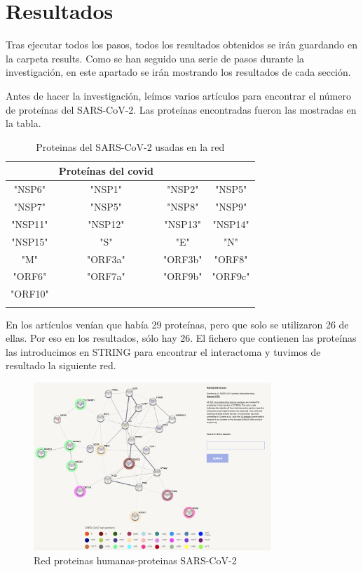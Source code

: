 
\section{Resultados}
Tras ejecutar todos los pasos, todos los resultados obtenidos se irán guardando en la carpeta results. Como se han seguido una serie de pasos durante la investigación, en este apartado se irán mostrando los resultados de cada sección. 

Antes de hacer la investigación, leímos varios artículos para encontrar el número de proteínas del SARS-CoV-2. Las proteínas encontradas fueron las mostradas en la tabla. 

  

		\begin{table}[h!]
			\caption{Proteinas del SARS-CoV-2 usadas en la red}
			\begin{tabular}{cccc}
				\hline
				& Proteínas del covid  &   & \\ 
				\hline
				"NSP6" & "NSP1" & "NSP2" & "NSP5"\\
				"NSP7" & "NSP5" & "NSP8"  & "NSP9"\\
				"NSP11" & "NSP12" & "NSP13" & "NSP14"\\ 
				"NSP15" & "S" & "E" & "N"\\
				"M" & "ORF3a" & "ORF3b" & "ORF8"\\
				"ORF6" & "ORF7a" & "ORF9b" & "ORF9c"\\
                "ORF10" \\
				\hline
				\label{tab:ejemplo}
			\end{tabular}
		\end{table}

		
En los artículos venían que había 29 proteínas, pero que solo se utilizaron 26 de ellas. Por eso en los resultados, sólo hay 26. 
El fichero que contienen las proteínas las introducimos en STRING para encontrar el interactoma y tuvimos de resultado la siguiente red. 

		\begin{figure}[h!]
			\includegraphics[width=0.8\textwidth]{figures/redinteractoma.jpg}
			\caption{Red proteinas humanas-proteinas SARS-CoV-2}
			\label{fig:cost_megabase}
		\end{figure}
		


